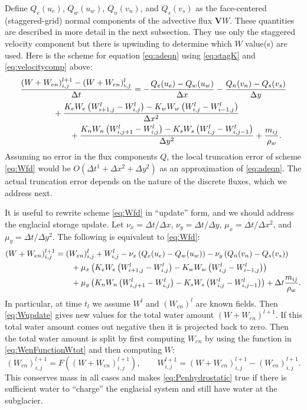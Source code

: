 \documentclass[11pt,final]{amsart}
\newcommand\bV{\mathbf{V}}
\newcommand{\Wlij}{W^l_{i,j}}
\begin{document}
Define $Q_e(u_e)$, $Q_w(u_w)$, $Q_n(v_n)$, and $Q_s(v_s)$ as the face-centered (staggered-grid) normal components of the advective flux $\bV W$.  These quantities are described in more detail in the next subsection.  They use only the staggered velocity component but there is upwinding to determine which $W$ value(s) are used.  Here is the scheme for equation \eqref{eq:adeqn} using \eqref{eq:stagK} and \eqref{eq:velocitycomp} above:
\begin{align}
 &\frac{(W+W_{en})_{i,j}^{l+1} - (W+W_{en})_{i,j}^l}{\Delta t} = - \frac{Q_e(u_e) - Q_w(u_w)}{\Delta x} - \frac{Q_n(v_n) - Q_s(v_s)}{\Delta y} \label{eq:Wfd} \\
      &\qquad\qquad + \frac{K_e W_e \left(W_{i+1,j}^l - \Wlij\right) - K_w W_w \left(\Wlij - W_{i-1,j}^l\right)}{\Delta x^2}  \notag \\
      &\qquad\qquad\qquad + \frac{K_n W_n \left(W_{i,j+1}^l - \Wlij\right) - K_s W_s \left(\Wlij - W_{i,j-1}^l\right)}{\Delta y^2}  + \frac{m_{ij}}{\rho_w}. \notag
\end{align}
Assuming no error in the flux components $Q$, the local truncation error \citep{MortonMayers} of scheme \eqref{eq:Wfd} would be $O(\Delta t^1 + \Delta x^2 + \Delta y^2)$ as an approximation of \eqref{eq:adeqn}.  The actual truncation error depends on the nature of the discrete fluxes, which we address next.

It is useful to rewrite scheme \eqref{eq:Wfd} in ``update'' form, and we should address the englacial storage update.  Let $\nu_x = \Delta t/\Delta x$, $\nu_y = \Delta t/\Delta y$, $\mu_x = \Delta t/\Delta x^2$, and $\mu_y = \Delta t/\Delta y^2$.  The following is equivalent to \eqref{eq:Wfd}:
\begin{align}
 (W+W_{en})_{i,j}^{l+1} &= (W_{en})_{i,j}^l + W_{i,j}^l - \nu_x \left(Q_e(u_e) - Q_w(u_w)\right) - \nu_y \left(Q_n(v_n) - Q_s(v_s)\right) \label{eq:Wupdate} \\
  &\qquad + \mu_x \left(K_e W_e \left(W_{i+1,j}^l - \Wlij\right) - K_w W_w \left(\Wlij - W_{i-1,j}^l\right)\right) \notag \\
  &\qquad + \mu_y \left(K_n W_n \left(W_{i,j+1}^l - \Wlij\right) - K_s W_s \left(\Wlij - W_{i,j-1}^l\right)\right) + \Delta t \frac{m_{ij}}{\rho_w}. \notag
\end{align}
In particular, at time $t_l$ we assume $W^l$ and $(W_{en})^l$ are known fields.  Then \eqref{eq:Wupdate} gives new values for the total water amount $(W+W_{en})^{l+1}$.  If this total water amount comes out negative then it is projected back to zero.  Then the total water amount is split by first computing $W_{en}$ by using the function in \eqref{eq:WenFunctionWtot} and then computing $W$:
\begin{equation} (W_{en})_{i,j}^{l+1} = F\left((W+W_{en})_{i,j}^{l+1}\right), \qquad  W_{i,j}^{l+1} = (W+W_{en})_{i,j}^{l+1} - (W_{en})_{i,j}^{l+1}.  \label{eq:Wenupdate}
\end{equation}
This conserves mass in all cases and makes \eqref{eq:Penhydrostatic} true if there is sufficient water to ``charge'' the englacial system and still have water at the subglacier.
\end{document}
